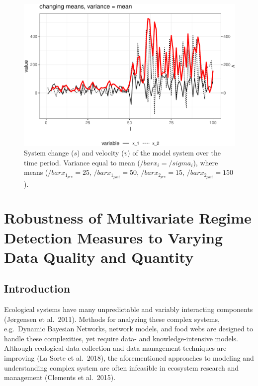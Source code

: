 \documentclass[12pt,twoside,openany]{reedthesis}
\begin{document}
\begin{figure}
\centering
\includegraphics{_myDissertation_files/figure-latex/velocSysEx4-1.pdf}
\caption{\label{fig:velocSysEx4}System change (\(s\)) and velocity (\(v\)) of the model system over the time period. Variance equal to mean (\(/bar{x_i}=/sigma_i\)), where means (\(/bar{x}_{1_{pre}}=25\), \(/bar{x}_{1_{post}}=50\), \(/bar{x}_{2_{pre}}=15\), \(/bar{x}_{2_{post}}=150\)).}
\end{figure}
\hypertarget{resampling}{%
\chapter{Robustness of Multivariate Regime Detection Measures to Varying Data Quality and Quantity}\label{resampling}}

\hypertarget{introduction-4}{%
\section{Introduction}\label{introduction-4}}

Ecological systems have many unpredictable and variably interacting components (Jørgensen et al.~2011). Methods for analyzing these complex systems, e.g.~Dynamic Bayesian Networks, network models, and food webs are designed to handle these complexities, yet require data- and knowledge-intensive models. Although ecological data collection and data management techniques are improving (La Sorte et al.~2018), the aforementioned approaches to modeling and understanding complex system are often infeasible in ecosystem research and management (Clements et al.~2015).
\end{document}
